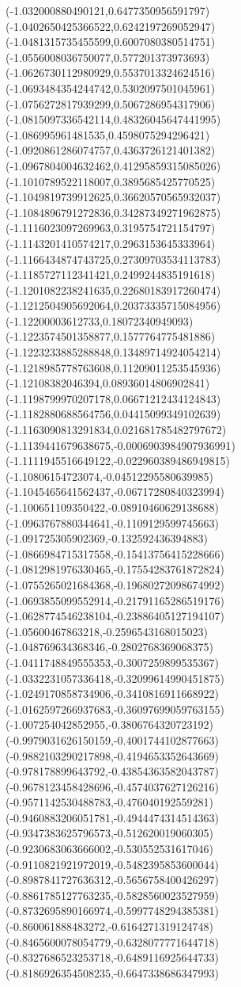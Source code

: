 {(-1.032000880490121,0.6477350956591797)
(-1.0402650425366522,0.6242197269052947)
(-1.0481315735455599,0.6007080380514751)
(-1.0556008036750077,0.577201373973693)
(-1.0626730112980929,0.5537013324624516)
(-1.0693484354244742,0.5302097501045961)
(-1.0756272817939299,0.5067286954317906)
(-1.0815097336542114,0.48326045647441995)
(-1.086995961481535,0.4598075294296421)
(-1.0920861286074757,0.4363726121401382)
(-1.0967804004632462,0.41295859315085026)
(-1.1010789522118007,0.3895685425770525)
(-1.1049819739912625,0.36620570565932037)
(-1.1084896791272836,0.34287349271962875)
(-1.1116023097269963,0.3195754721154797)
(-1.1143201410574217,0.2963153645333964)
(-1.1166434874743725,0.27309703534113783)
(-1.1185727112341421,0.2499244835191618)
(-1.1201082238241635,0.22680183917260474)
(-1.1212504905692064,0.20373335715084956)
(-1.12200003612733,0.18072340949093)
(-1.1223574501358877,0.1577764775481886)
(-1.1223233885288848,0.13489714924054214)
(-1.1218985778763608,0.11209011253545936)
(-1.12108382046394,0.08936014806902841)
(-1.1198799970207178,0.06671212434124843)
(-1.1182880688564756,0.04415099349102639)
(-1.1163090813291834,0.021681785482797672)
(-1.1139441679638675,-0.0006903984907936991)
(-1.1111945516649122,-0.022960389486949815)
(-1.10806154723074,-0.04512295580639985)
(-1.1045465641562437,-0.06717280840323994)
(-1.100651109350422,-0.08910460629138688)
(-1.0963767880344641,-0.1109129599745663)
(-1.091725305902369,-0.132592436394883)
(-1.0866984715317558,-0.15413756415228666)
(-1.0812981976330465,-0.17554283761872824)
(-1.0755265021684368,-0.19680272098674992)
(-1.0693855099552914,-0.21791165286519176)
(-1.0628774546238104,-0.23886405127194107)
(-1.05600467863218,-0.2596543168015023)
(-1.048769634368346,-0.2802768369068375)
(-1.0411748849555353,-0.3007259899535367)
(-1.0332231057336418,-0.32099614990451875)
(-1.0249170858734906,-0.3410816911668922)
(-1.0162597266937683,-0.36097699059763155)
(-1.007254042852955,-0.3806764320723192)
(-0.9979031626150159,-0.4001744102877663)
(-0.9882103290217898,-0.4194653352643669)
(-0.978178899643792,-0.43854363582043787)
(-0.9678123458428696,-0.4574037627126216)
(-0.9571142530488783,-0.476040192559281)
(-0.9460883206051781,-0.4944474314514363)
(-0.9347383625796573,-0.512620019060305)
(-0.9230683063666002,-0.530552531617046)
(-0.9110821921972019,-0.5482395853600044)
(-0.8987841727636312,-0.5656758400426297)
(-0.8861785127763235,-0.5828560023527959)
(-0.8732695890166974,-0.5997748294385381)
(-0.860061888483272,-0.6164271319124748)
(-0.8465600078054779,-0.6328077771644718)
(-0.8327686523253718,-0.6489116925644733)
(-0.8186926354508235,-0.6647338686347993)
}
